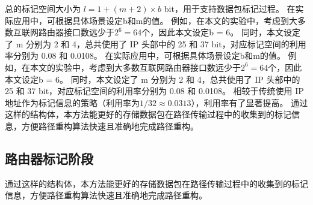 总的标记空间大小为 $l = 1 + (m + 2) \times b$ bit，用于支持数据包标记过程。
在实际应用中，可根据具体场景设定b和m的值。
例如，在本文的实验中，考虑到大多数互联网路由器接口数远少于$2^6 =64$个，因此本文设定b = 6。
同时，本文设定了 m 分别为 2 和 4，总共使用了 IP 头部中的 25 和 37 bit，对应标记空间的利用率分别为 0.08 和 0.0108。
在实际应用中，可根据具体场景设定b和m的值。
例如，在本文的实验中，考虑到大多数互联网路由器接口数远少于$2^6 =64$个，因此本文设定b = 6。
同时，本文设定了 m 分别为 2 和 4，总共使用了 IP 头部中的 25 和 37 bit，对应标记空间的利用率分别为 0.08 和 0.0108。
相较于传统使用 IP 地址作为标记信息的策略（利用率为$1/32 \approx 0.0313$），利用率有了显著提高。
通过这样的结构体，本方法能更好的存储数据包在路径传输过程中的收集到的标记信息，方便路径重构算法快速且准确地完成路径重构。\par

\subsection{路由器标记阶段}
通过这样的结构体，本方法能更好的存储数据包在路径传输过程中的收集到的标记信息，方便路径重构算法快速且准确地完成路径重构。\par

